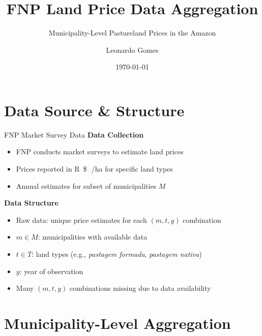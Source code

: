 \documentclass[aspectratio=169,11pt]{beamer}
\title{FNP Land Price Data Aggregation}
\subtitle{Municipality-Level Pastureland Prices in the Amazon}
\author{Leonardo Gomes}
\date{\today}
\newcommand{\priceunit}{\si{R\$\,/ha}}
\begin{document}
\begin{frame}
  \titlepage
\end{frame}

\section{Data Source \& Structure}

\begin{frame}{FNP Market Survey Data}
  \textbf{Data Collection}
  \begin{itemize}
    \item FNP conducts market surveys to estimate land prices
    \item Prices reported in \priceunit{} for specific land types
    \item Annual estimates for subset of municipalities $M$
  \end{itemize}

  \vspace{0.6em}
  \textbf{Data Structure}
  \begin{itemize}
    \item Raw data: unique price estimates for each $(m, t, y)$ combination
    \item $m \in M$: municipalities with available data
    \item $t \in T$: land types (e.g., \textit{pastagem formada}, \textit{pastagem nativa})
    \item $y$: year of observation
    \item Many $(m, t, y)$ combinations missing due to data availability
  \end{itemize}
\end{frame}

\section{Municipality-Level Aggregation}
\end{document}

